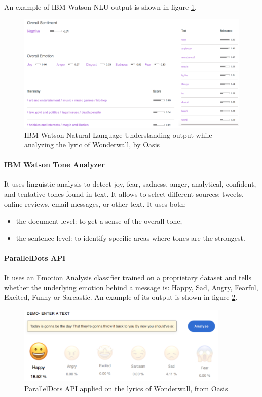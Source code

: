 An example of IBM Watson NLU output is shown in figure \ref{fig:ibm_watson_wonderwall}.

\begin{figure}[H]
\centering
\includegraphics[width=1\textwidth]{./chapters/chapter3/images/ibm-watson-wonderwall}
\caption{IBM Watson Natural Language Understanding output while analyzing the lyric of Wonderwall, by Oasis}
\label{fig:ibm_watson_wonderwall}
\end{figure}

\paragraph{IBM Watson Tone Analyzer}\cite{ibm_watson_tone}
It uses linguistic analysis to detect joy, fear, sadness, anger, analytical, confident, and tentative tones found in text. It allows to select different sources: tweets, online reviews, email messages, or other text. It uses both:
\begin{itemize}
\item the document level: to get a sense of the overall tone;
\item the sentence level: to identify specific areas where tones are the strongest.
\end{itemize}

\paragraph{ParallelDots API}\cite{paralleldots}
It uses an Emotion Analysis classifier trained on a proprietary dataset and tells whether the underlying emotion behind a message is: Happy,
Sad, Angry, Fearful, Excited, Funny or Sarcastic. An example of its output is shown in figure \ref{fig:paralleldots}.

\begin{figure}[H]
\centering
\includegraphics[width=0.9\textwidth]{./chapters/chapter3/images/paralleldots}
\caption{ParallelDots API applied on the lyrics of Wonderwall, from Oasis}
\label{fig:paralleldots}
\end{figure}

